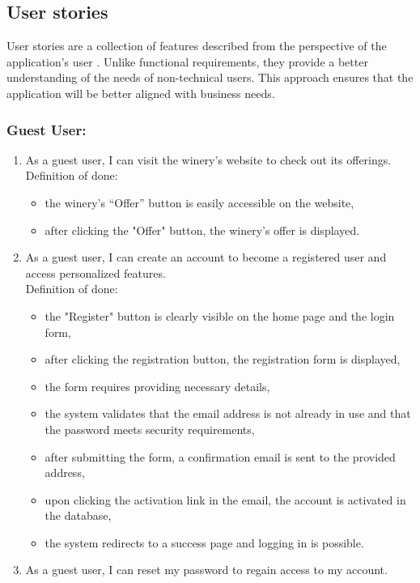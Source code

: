 \subsection{User stories}
User stories are a collection of features described from the perspective of the application’s user \cite{cohn2004}. Unlike functional requirements, they provide a better understanding of the needs of non-technical users. This approach ensures that the application will be better aligned with business needs.
\subsubsection{Guest User:}

\begin{enumerate}
	\item As a guest user, I can visit the winery's website to check out its offerings.
	\\Definition of done:
	\begin{itemize}
		\item the winery's “Offer” button is easily accessible on the website,
		\item after clicking the "Offer" button, the winery's offer is displayed.
	\end{itemize}
	\item As a guest user, I can create an account to become a registered user and access personalized features.
	\\Definition of done:
	\begin{itemize}
		\item the "Register" button is clearly visible on the home page and the login form,
		\item after clicking the registration button, the registration form is displayed,
		\item the form requires providing necessary details,
		\item the system validates that the email address is not already in use and that the password meets security requirements,
		\item after submitting the form, a confirmation email is sent to the provided address,
		\item upon clicking the activation link in the email, the account is activated in the database,
		\item the system redirects to a success page and logging in is possible.
	\end{itemize}
	\item As a guest user, I can reset my password to regain access to my account.

\end{enumerate}
